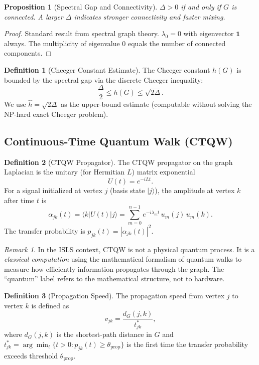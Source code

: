 \documentclass[11pt,a4paper,twoside]{article}
\theoremstyle{definition}
\newtheorem{definition}{Definition}[section]
\theoremstyle{plain}
\newtheorem{proposition}{Proposition}[section]
\theoremstyle{remark}
\newtheorem{remark}{Remark}[section]
\newcommand{\ISLS}{\textsf{ISLS}}
\begin{document}
\begin{proposition}[Spectral Gap and Connectivity]\label{prop:specgap}
$\Delta > 0$ if and only if $G$ is connected. A larger $\Delta$
indicates stronger connectivity and faster mixing.
\end{proposition}

\begin{proof}
Standard result from spectral graph theory. $\lambda_0 = 0$ with
eigenvector $\mathbf{1}$ always. The multiplicity of eigenvalue $0$
equals the number of connected components.
\end{proof}

\begin{definition}[Cheeger Constant Estimate]\label{def:cheeger}
The Cheeger constant $h(G)$ is bounded by the spectral gap via the
discrete Cheeger inequality:
\[
  \frac{\Delta}{2} \le h(G) \le \sqrt{2\Delta}.
\]
We use $\hat{h} = \sqrt{2\Delta}$ as the upper-bound estimate (computable
without solving the NP-hard exact Cheeger problem).
\end{definition}


\subsection{Continuous-Time Quantum Walk (CTQW)}

\begin{definition}[CTQW Propagator]\label{def:ctqw}
The CTQW propagator on the graph Laplacian is the unitary (for
Hermitian $L$) matrix exponential
\[
  U(t) = e^{-iLt}.
\]
For a signal initialized at vertex $j$ (basis state $|j\rangle$),
the amplitude at vertex $k$ after time $t$ is
\[
  \alpha_{jk}(t) = \langle k | U(t) | j \rangle
  = \sum_{m=0}^{n-1} e^{-i\lambda_m t}\, u_m(j)\, u_m(k).
\]
The transfer probability is $p_{jk}(t) = |\alpha_{jk}(t)|^2$.
\end{definition}

\begin{remark}
In the \ISLS{} context, CTQW is not a physical quantum process. It is
a \emph{classical computation} using the mathematical formalism of
quantum walks to measure how efficiently information propagates through
the graph. The ``quantum'' label refers to the mathematical structure,
not to hardware.
\end{remark}

\begin{definition}[Propagation Speed]\label{def:propspeed}
The propagation speed from vertex $j$ to vertex $k$ is defined as
\[
  v_{jk} = \frac{d_G(j,k)}{t^*_{jk}},
\]
where $d_G(j,k)$ is the shortest-path distance in $G$ and
$t^*_{jk} = \arg\min_t \{t > 0 : p_{jk}(t) \ge \theta_{\mathrm{prop}}\}$
is the first time the transfer probability exceeds threshold
$\theta_{\mathrm{prop}}$.
\end{definition}
\end{document}
